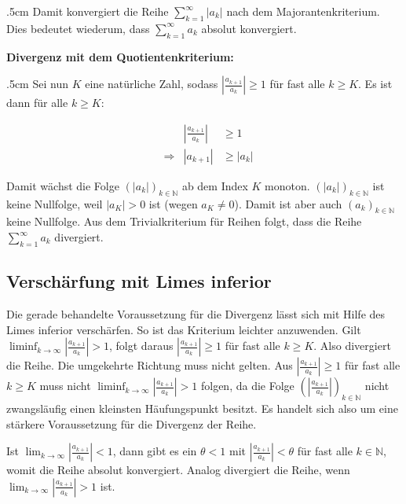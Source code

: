 \documentclass[fontsize=9pt,
               parskip=half-,
               DIV=14,
               listof=chapterentry,
               tocflat]{scrbook}
\newenvironment{indentblock}{\begin{adjustwidth}{.5cm}{}}{\end{adjustwidth}}
\newcommand{\proofstep}[1]{\textbf{\textcolor{sblau}{#1}}}
\begin{document}
\begin{proof*}
\begin{indentblock}
Damit konvergiert die Reihe $\sum _{k=1}^{\infty }|a_{k}|$ nach dem Majorantenkriterium. Dies bedeutet wiederum, dass $\sum _{k=1}^{\infty }a_{k}$ absolut konvergiert.

\end{indentblock}

\proofstep{Divergenz mit dem Quotientenkriterium:}
 \begin{indentblock}
Sei nun $K$ eine natürliche Zahl, sodass $\left|{\tfrac {a_{k+1}}{a_{k}}}\right|\geq 1$ für fast alle $k\geq K$. Es ist dann für alle $k\geq K$:

\begin{align*}
&&\left|{\frac {a_{k+1}}{a_{k}}}\right|&\geq 1\\[0.5em]&\Rightarrow &|a_{k+1}|&\geq |a_{k}|
\end{align*}

Damit wächst die Folge $\left(|a_{k}|\right)_{k\in \mathbb {N} }$ ab dem Index $K$ monoton. $\left(|a_{k}|\right)_{k\in \mathbb {N} }$ ist keine Nullfolge, weil $|a_{K}|>0$ ist (wegen $a_{K}\neq 0$). Damit ist aber auch $\left(a_{k}\right)_{k\in \mathbb {N} }$ keine Nullfolge. Aus dem Trivialkriterium für Reihen folgt, dass die Reihe $\sum _{k=1}^{\infty }a_{k}$ divergiert.

\end{indentblock}

\end{proof*}

\subsection{Verschärfung mit Limes inferior}

Die gerade behandelte Voraussetzung für die Divergenz lässt sich mit Hilfe des Limes inferior verschärfen. So ist das Kriterium leichter anzuwenden. Gilt $\liminf _{k\to \infty }\left|{\tfrac {a_{k+1}}{a_{k}}}\right|>1$, folgt daraus $\left|{\tfrac {a_{k+1}}{a_{k}}}\right|\geq 1$ für fast alle $k\geq K$. Also divergiert die Reihe. Die umgekehrte Richtung muss nicht gelten. Aus $\left|{\tfrac {a_{k+1}}{a_{k}}}\right|\geq 1$ für fast alle $k\geq K$ muss nicht $\liminf _{k\to \infty }\left|{\tfrac {a_{k+1}}{a_{k}}}\right|>1$ folgen, da die Folge $\left(\left|{\tfrac {a_{k+1}}{a_{k}}}\right|\right)_{k\in \mathbb {N} }$ nicht zwangsläufig einen kleinsten Häufungspunkt besitzt. Es handelt sich also um eine stärkere Voraussetzung für die Divergenz der Reihe.

\begin{hint*}
Ist $\lim _{k\to \infty }\left|{\tfrac {a_{k+1}}{a_{k}}}\right|<1$, dann gibt es ein $\theta <1$ mit $\left|{\tfrac {a_{k+1}}{a_{k}}}\right|<\theta $ für fast alle $k\in \mathbb {N} $, womit die Reihe absolut konvergiert. Analog divergiert die Reihe, wenn $\lim _{k\to \infty }\left|{\tfrac {a_{k+1}}{a_{k}}}\right|>1$ ist.

\end{hint*}
\end{document}
